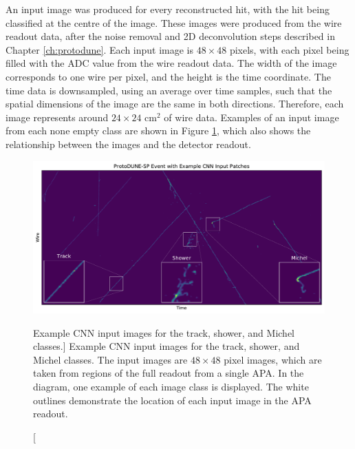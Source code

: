An input image was produced for every reconstructed hit, with the hit being 
classified at the centre of the image. These images were produced from the 
wire readout data, after the noise removal and 2D deconvolution steps 
described in Chapter \ref{ch:protodune}. Each input image is $48 \times 48$ 
pixels, with each pixel being filled with the ADC value from the wire readout 
data. The width of the image corresponds to one wire per pixel, and the height 
is the time coordinate. The time data is downsampled, using an average over 
time samples, such that the spatial dimensions of the image are the same in 
both directions. Therefore, each image represents around $24 \times 24 \mbox{ 
cm}^2$ of wire data. Examples of an input image from each none empty class are 
shown in Figure \ref{fig:patches}, which also shows the relationship between 
the images and the detector readout.

\begin{figure}
	\centering
	\includegraphics[width=\textwidth]{figures/patch_zoom.pdf}  
	\caption
	[Example CNN input images for the track, shower, and Michel classes.]
	{Example CNN input images for the track, shower, and Michel classes. The 
	input images are $48 \times 48$ pixel images, which are taken from regions of 
	the full readout from a single APA. In the diagram, one example of each image 
	class is displayed. The white outlines demonstrate the location of each input 
	image in the APA readout.}
	\label{fig:patches}
\end{figure}

